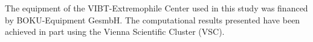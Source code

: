 \documentclass[12pt, a4paper]{report}
\begin{document}
\newpage
The equipment of the VIBT-Extremophile Center used in this study was financed by BOKU-Equipment GesmbH. The computational results presented have been achieved in part using the Vienna Scientific Cluster (VSC). \\
\newpage
%
%

\newpage
\listoffigures
{}
\newpage
\listoftables
{}
\newpage
\vspace{2cm}

%
%
%
\end{document}
